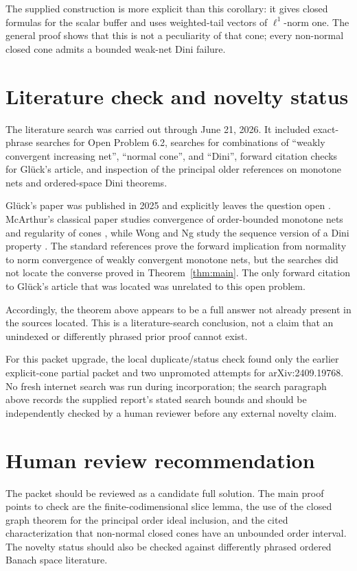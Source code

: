 \documentclass[11pt]{article}
\theoremstyle{remark}
\begin{document}
The supplied construction is more explicit than this corollary: it gives
closed formulas for the scalar buffer and uses weighted-tail vectors of
$\ell^1$-norm one.  The general proof shows that this is not a peculiarity
of that cone; every non-normal closed cone admits a bounded weak-net Dini
failure.

\section{Literature check and novelty status}

The literature search was carried out through June 21, 2026.  It included
exact-phrase searches for Open Problem 6.2, searches for combinations of
``weakly convergent increasing net'', ``normal cone'', and ``Dini'', forward
citation checks for Gl\"uck's article, and inspection of the principal older
references on monotone nets and ordered-space Dini theorems.

Gl\"uck's paper was published in 2025 and explicitly leaves the question
open \cite{Glueck2025}.  McArthur's classical paper studies convergence of
order-bounded monotone nets and regularity of cones
\cite{McArthur1970}, while Wong and Ng study the sequence version of a Dini
property \cite{WongNg1975}.  The standard references prove the forward
implication from normality to norm convergence of weakly convergent
monotone nets, but the searches did not locate the converse proved in
Theorem~\ref{thm:main}.  The only forward citation to Gl\"uck's article that
was located was unrelated to this open problem.

Accordingly, the theorem above appears to be a full answer not already
present in the sources located.  This is a literature-search conclusion,
not a claim that an unindexed or differently phrased prior proof cannot
exist.

For this packet upgrade, the local duplicate/status check found only the
earlier explicit-cone partial packet and two unpromoted attempts for
arXiv:2409.19768.  No fresh internet search was run during incorporation;
the search paragraph above records the supplied report's stated search bounds
and should be independently checked by a human reviewer before any external
novelty claim.

\section{Human review recommendation}

The packet should be reviewed as a candidate full solution.  The main proof
points to check are the finite-codimensional slice lemma, the use of the
closed graph theorem for the principal order ideal inclusion, and the cited
characterization that non-normal closed cones have an unbounded order
interval.  The novelty status should also be checked against differently
phrased ordered Banach space literature.
\end{document}
